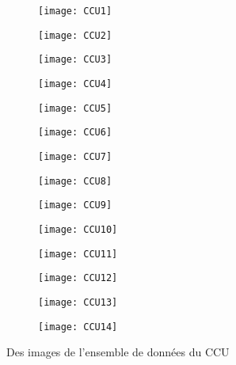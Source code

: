\begin{figure}[h]
\centering
\begin{subfigure}{0.125\textwidth}\texttt{[image: CCU1]}\end{subfigure}
\begin{subfigure}{0.125\textwidth}\texttt{[image: CCU2]}\end{subfigure}
\begin{subfigure}{0.125\textwidth}\texttt{[image: CCU3]}\end{subfigure}
\begin{subfigure}{0.125\textwidth}\texttt{[image: CCU4]}\end{subfigure}
\begin{subfigure}{0.125\textwidth}\texttt{[image: CCU5]}\end{subfigure}
\begin{subfigure}{0.125\textwidth}\texttt{[image: CCU6]}\end{subfigure}
\begin{subfigure}{0.125\textwidth}\texttt{[image: CCU7]}\end{subfigure}
\begin{subfigure}{0.125\textwidth}\texttt{[image: CCU8]}\end{subfigure}
\begin{subfigure}{0.125\textwidth}\texttt{[image: CCU9]}\end{subfigure}
\begin{subfigure}{0.125\textwidth}\texttt{[image: CCU10]}\end{subfigure}
\begin{subfigure}{0.125\textwidth}\texttt{[image: CCU11]}\end{subfigure}
\begin{subfigure}{0.125\textwidth}\texttt{[image: CCU12]}\end{subfigure}
\begin{subfigure}{0.125\textwidth}\texttt{[image: CCU13]}\end{subfigure}
\begin{subfigure}{0.125\textwidth}\texttt{[image: CCU14]}\end{subfigure}
\caption{Des images de l'ensemble de données du CCU}
\end{figure}

